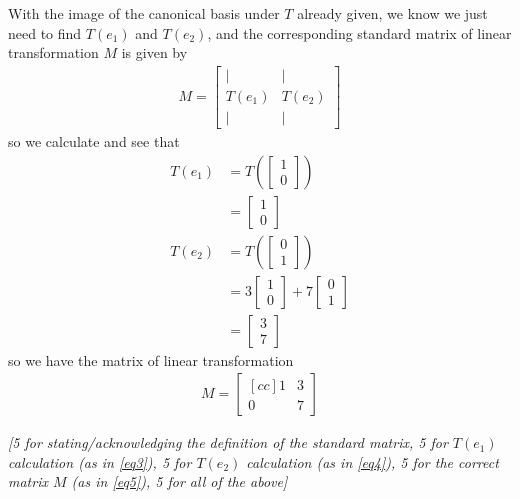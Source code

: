 \documentclass[answers,11pt]{exam}
\theoremstyle{definition}
\theoremstyle{definition}
\DeclareMathOperator{\1}{\mathbbm{1}}
\begin{document}
\begin{questions}
\begin{solution}
	
	With the image of the canonical basis under $T$ already given, we know we just need to find $T(e_1)$ and $T(e_2)$, and the corresponding standard matrix of linear transformation $M$ is given by
	\begin{align*}
	M = \begin{bmatrix}
	| & | \\ T(e_1) & T(e_2) \\ | & |
	\end{bmatrix}
	\end{align*}
	so we calculate and see that
	\begin{align}
	\nonumber T(e_1) &= T\left( \begin{bmatrix} 1 \\ 0 \end{bmatrix} \right) \\
	\label{eq3} \tag{$\star \star$} &= \begin{bmatrix} 1 \\ 0 \end{bmatrix} \\
	\nonumber T(e_2) &= T\left( \begin{bmatrix} 0 \\ 1 \end{bmatrix} \right) \\
	\nonumber &= 3 \begin{bmatrix} 1 \\ 0 \end{bmatrix} + 7 \begin{bmatrix} 0 \\ 1 \end{bmatrix} \\
	\label{eq4} \tag{$\ast \ast$} &= \begin{bmatrix} 3 \\ 7 \end{bmatrix}
	\end{align}
	so we have the matrix of linear transformation
	\begin{align}
	\label{eq5}
	\tag{$\dagger$}
	M = \begin{bmatrix}[c c]
	1 & 3 \\ 0 & 7
	\end{bmatrix}
	\end{align}
	
	
	\textit{[5 for stating/acknowledging the definition of the standard matrix, 5 for $T(e_1)$ calculation (as in \eqref{eq3}), 5 for $T(e_2)$ calculation (as in \eqref{eq4}), 5 for the correct matrix $M$ (as in \eqref{eq5}), 5 for all of the above]}
\end{solution}

\end{questions}
\end{document}
